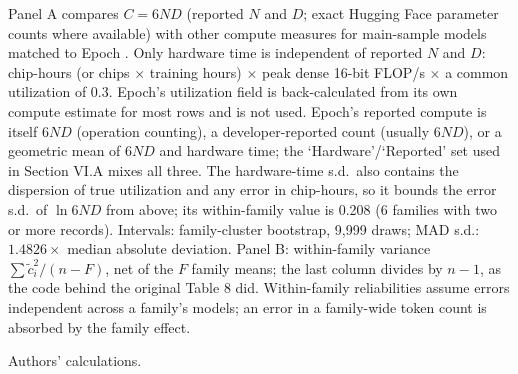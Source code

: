 \begin{table}[tp]
\begin{tablenotes}
Panel A compares $C=6ND$ (reported $N$ and $D$; exact Hugging Face parameter counts where available) with other compute measures for main-sample models matched to Epoch \citep{epochai2026data}. Only hardware time is independent of reported $N$ and $D$: chip-hours (or chips $\times$ training hours) $\times$ peak dense 16-bit FLOP/s $\times$ a common utilization of 0.3. Epoch's utilization field is back-calculated from its own compute estimate for most rows and is not used. Epoch's reported compute is itself $6ND$ (operation counting), a developer-reported count (usually $6ND$), or a geometric mean of $6ND$ and hardware time; the `Hardware'/`Reported' set used in Section VI.A mixes all three. The hardware-time s.d.\ also contains the dispersion of true utilization and any error in chip-hours, so it bounds the error s.d.\ of $\ln 6ND$ from above; its within-family value is 0.208 (6 families with two or more records). Intervals: family-cluster bootstrap, 9,999 draws; MAD s.d.: $1.4826\times$ median absolute deviation. Panel B: within-family variance $\sum\tilde c_i^2/(n-F)$, net of the $F$ family means; the last column divides by $n-1$, as the code behind the original Table 8 did. Within-family reliabilities assume errors independent across a family's models; an error in a family-wide token count is absorbed by the family effect.
\end{tablenotes}
\begin{tablenotes}[Source]
Authors' calculations.
\end{tablenotes}
\end{table}
